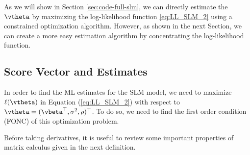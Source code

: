 As we will show in Section \ref{sec:code-full-slm}, we can directly estimate the $\vtheta$ by maximizing the log-likelihood function \eqref{eq:LL_SLM_2} using a constrained optimization algorithm. However, as shown in the next Section, we can create a more easy estimation algorithm by concentrating the log-likelihood function. 

\subsection{Score Vector and Estimates}\label{sec:score_sml}

In order to find the ML estimates for the SLM model, we need to maximize $\ell(\vtheta)$ in Equation (\ref{eq:LL_SLM_2}) with respect to $\vtheta = (\vbeta^\top, \sigma^2 , \rho)^\top$. To do so, we need to find the first order condition (FONC) of this optimization problem. 

Before taking derivatives, it is useful to review some important properties of matrix calculus given in the next definition. 

